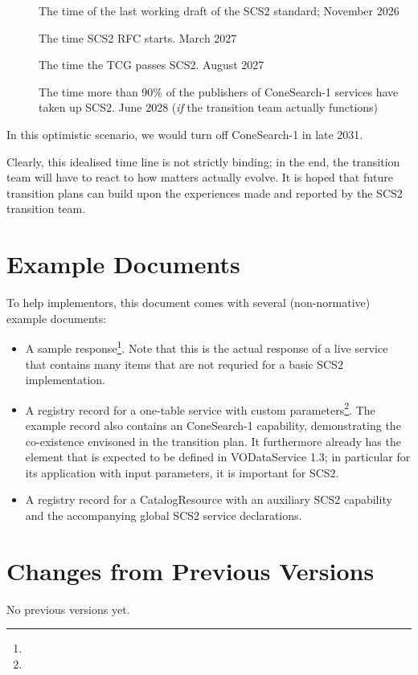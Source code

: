 \documentclass[11pt,a4paper]{ivoa}
\begin{document}
\begin{description}
\item [] The time of the last working draft of the SCS2
standard; November 2026

\item[] The time SCS2 RFC starts.  March 2027

\item[] The time the TCG passes SCS2.  August 2027

\item[] The time more than 90\% of the publishers of
ConeSearch-1 services have taken up SCS2.  June 2028 (\textit{if} the
transition team actually functions)

\end{description}

In this optimistic scenario, we would turn off ConeSearch-1 in
late 2031.

Clearly, this idealised time line is not strictly binding; in the end,
the transition team will have to react to how matters actually evolve.
It is hoped that future transition plans can build upon the experiences
made and reported by the SCS2 transition team.

\section{Example Documents}
\label{app:examples}

To help implementors, this document comes with several (non-normative)
example documents:

\begin{itemize}
\item A sample response\footnote{}.
Note that this is the actual response of a live service that contains
many items that are not requried for a basic SCS2 implementation.

\item A registry record for a one-table service with custom
parameters\footnote{}.
The example record also contains an ConeSearch-1 capability,
demonstrating the co-existence envisoned in the transition plan.
It furthermore already has the  element that is expected to
be defined in VODataService 1.3; in particular for its application with
input parameters, it is important for SCS2.

\item A registry record for a CatalogResource with an auxiliary SCS2
capability and the accompanying global SCS2 service
declarations.
\end{itemize}

\section{Changes from Previous Versions}

No previous versions yet.



\end{document}
